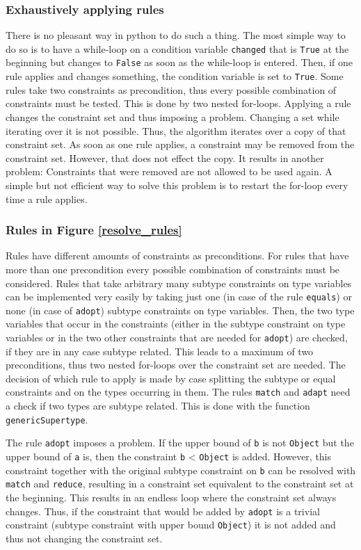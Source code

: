 \subsubsection{Exhaustively applying rules}
There is no pleasant way in python to do such a thing. The most simple way to do so is to have a while-loop on a condition variable \verb|changed| that is \verb|True| at the beginning but changes to \verb|False| as soon as the while-loop is entered. Then, if one rule applies and changes something, the condition variable is set to \verb|True|.
Some rules take two constraints as precondition, thus every possible combination of constraints must be tested. This is done by two nested for-loops.
Applying a rule changes the constraint set and thus imposing a problem. Changing a set while iterating over it is not possible. Thus, the algorithm iterates over a copy of that constraint set. As soon as one rule applies, a constraint may be removed from the constraint set. However, that does not effect the copy. It results in another problem: Constraints that were removed are not allowed to be used again.
A simple but not efficient way to solve this problem is to restart the for-loop every time a rule applies.

\subsubsection{Rules in Figure \ref{resolve_rules}}
Rules have different amounts of constraints as preconditions. For rules that have more than one precondition every possible combination of constraints must be considered. Rules that take arbitrary many subtype constraints on type variables can be implemented very easily by taking just one (in case of the rule \verb|equals|) or none (in case of \verb|adopt|) subtype constraints on type variables.
Then, the two type variables that occur in the constraints (either in the subtype constraint on type variables or in the two other constraints that are needed for \verb|adopt|) are checked, if they are in any case subtype related.
This leads to a maximum of two preconditions, thus two nested for-loops over the constraint set are needed.
The decision of which rule to apply is made by case splitting the subtype or equal constraints and on the types occurring in them.
The rules \verb|match| and \verb|adapt| need a check if two types are subtype related. This is done with the function \verb|genericSupertype|.

The rule \verb|adopt| imposes a problem. If the upper bound of \verb|b| is not \verb|Object| but the upper bound of \verb|a| is, then the constraint \verb|b| < \verb|Object| is added. However, this constraint together with the original subtype constraint on \verb|b| can be resolved with \verb|match| and \verb|reduce|, resulting in a constraint set equivalent to the constraint set at the beginning.
This results in an endless loop where the constraint set always changes. Thus, if the constraint that would be added by \verb|adopt| is a trivial constraint (subtype constraint with upper bound \verb|Object|) it is not added and thus not changing the constraint set.

